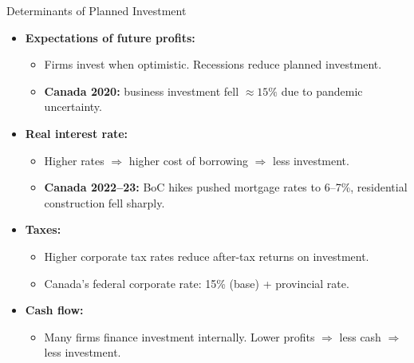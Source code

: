\documentclass[aspectratio=169]{beamer}
\begin{document}
\begin{frame}{Determinants of Planned Investment}
\transfade
\begin{itemize}
  \item \textbf{Expectations of future profits:}
  \begin{itemize}
    \item Firms invest when optimistic. Recessions reduce planned investment.
    \item \textbf{Canada 2020:} business investment fell $\approx 15\%$ due to pandemic uncertainty.
  \end{itemize}
  \item \textbf{Real interest rate:}
  \begin{itemize}
    \item Higher rates $\Rightarrow$ higher cost of borrowing $\Rightarrow$ less investment.
    \item \textbf{Canada 2022--23:} BoC hikes pushed mortgage rates to 6--7\%, residential construction fell sharply.
  \end{itemize}
  \item \textbf{Taxes:}
  \begin{itemize}
    \item Higher corporate tax rates reduce after-tax returns on investment.
    \item Canada's federal corporate rate: 15\% (base) + provincial rate.
  \end{itemize}
  \item \textbf{Cash flow:}
  \begin{itemize}
    \item Many firms finance investment internally. Lower profits $\Rightarrow$ less cash $\Rightarrow$ less investment.
  \end{itemize}
\end{itemize}
\end{frame}
\end{document}
